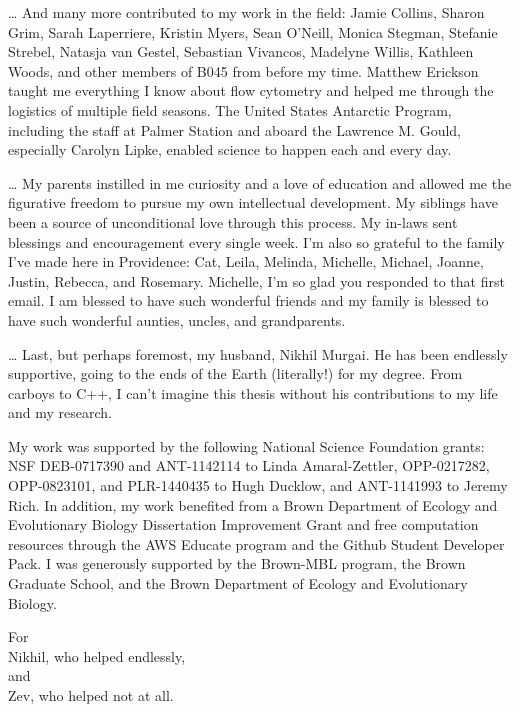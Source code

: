 \documentclass[final,letter,oneside,
12pt, %
doublespacing, %
]{brownthesis} %
\newenvironment{dedication}
  {
   \clearpage           %
   \thispagestyle{empty}%
   \vspace*{\stretch{1.5}}%
   \itshape             %
   \large								%
   \raggedleft          %
  }
  {\par %
   \vspace{\stretch{2}} %
   \clearpage           %
  }
\begin{document}
… And many more contributed to my work in the field: Jamie Collins, Sharon Grim, Sarah Laperriere, Kristin Myers, Sean O’Neill, Monica Stegman, Stefanie Strebel, Natasja van Gestel, Sebastian Vivancos, Madelyne Willis, Kathleen Woods, and other members of B045 from before my time. Matthew Erickson taught me everything I know about flow cytometry and helped me through the logistics of multiple field seasons. The United States Antarctic Program, including the staff at Palmer Station and aboard the Lawrence M. Gould, especially Carolyn Lipke, enabled science to happen each and every day.
 
… My parents instilled in me curiosity and a love of education and allowed me the figurative freedom to pursue my own intellectual development. My siblings have been a source of unconditional love through this process. My in-laws sent blessings and encouragement every single week. I’m also so grateful to the family I’ve made here in Providence: Cat, Leila, Melinda, Michelle, Michael, Joanne, Justin, Rebecca, and Rosemary. Michelle, I’m so glad you responded to that first email. I am blessed to have such wonderful friends and my family is blessed to have such wonderful aunties, uncles, and grandparents.
 
… Last, but perhaps foremost, my husband, Nikhil Murgai. He has been endlessly supportive, going to the ends of the Earth (literally!) for my degree. From carboys to C++, I can’t imagine this thesis without his contributions to my life and my research.
 
My work was supported by the following National Science Foundation grants: NSF DEB-0717390 and ANT-1142114 to Linda Amaral-Zettler, OPP-0217282, OPP-0823101, and PLR-1440435 to Hugh Ducklow, and ANT-1141993 to Jeremy Rich. In addition, my work benefited from a Brown Department of Ecology and Evolutionary Biology Dissertation Improvement Grant and free computation resources through the AWS Educate program and the Github Student Developer Pack. I was generously supported by the Brown-MBL program, the Brown Graduate School, and the Brown Department of Ecology and Evolutionary Biology.




\begin{dedication}
For\\
Nikhil, who helped endlessly,\\
and\\
Zev, who helped not at all.
\end{dedication}
\end{document}
